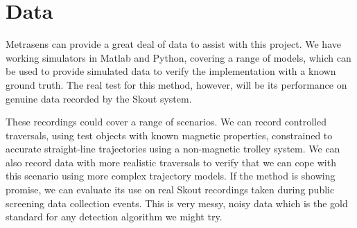 \documentclass[10pt, a4paper, twocolumn]{article} %
\begin{document}
\section{Data}

Metrasens can provide a great deal of data to assist with this project. We have working simulators in Matlab and Python, covering a range of models, which can be used to provide simulated data to verify the implementation with a known ground truth. The real test for this method, however, will be its performance on genuine data recorded by the Skout system.

These recordings could cover a range of scenarios. We can record controlled traversals, using test objects with known magnetic properties, constrained to accurate straight-line trajectories using a non-magnetic trolley system. We can also record data with more realistic traversals to verify that we can cope with this scenario using more complex trajectory models. If the method is showing promise, we can evaluate its use on real Skout recordings taken during public screening data collection events. This is very messy, noisy data which is the gold standard for any detection algorithm we might try.


\printbibliography[title={References}] %

\end{document}
